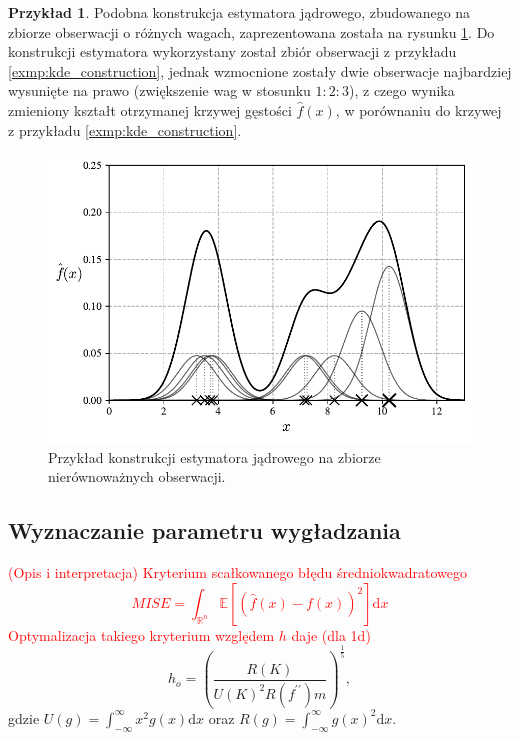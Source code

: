 \documentclass[12pt,a4paper,oneside]{book}
\theoremstyle{definition}
\newtheorem{exmp}{Przykład}[chapter]
\begin{document}
\begin{exmp}
Podobna konstrukcja estymatora jądrowego, zbudowanego na zbiorze obserwacji o różnych wagach, zaprezentowana została na rysunku \ref{fig:kde_construction_weighted}. Do konstrukcji estymatora wykorzystany został zbiór obserwacji z przykładu \ref{exmp:kde_construction}, jednak wzmocnione zostały dwie obserwacje najbardziej wysunięte na prawo (zwiększenie wag w stosunku $1:2:3$), z czego wynika zmieniony kształt otrzymanej krzywej gęstości $\hat{f}(x)$, w porównaniu do krzywej z przykładu \ref{exmp:kde_construction}.

\begin{figure}[H]
    \centering
    \includegraphics[scale=0.65]{kde_construction_weighted}
    \vspace{-0.5cm} 
    \caption{Przykład konstrukcji estymatora jądrowego na zbiorze nierównoważnych obserwacji.}
    \label{fig:kde_construction_weighted}
\end{figure}
\end{exmp}

\subsection{Wyznaczanie parametru wygładzania} \label{subsec:bandwidth_selection}

\textcolor{red}{(Opis i interpretacja) Kryterium scałkowanego błędu średniokwadratowego
\begin{equation} \label{eq:mise}
MISE = \int_{\mathbb{R}^n} \mathbb{E}[(\hat{f}(x) - f(x))^2] \mathrm{d}x
\end{equation}
Optymalizacja takiego kryterium względem $h$ daje (dla 1d)}
\begin{equation} \label{eq:opt_bandwidth1}
h_o = \left( \frac{R(K)}{U(K)^2 R(f^{\prime\prime}) m} \right)^\frac{1}{5},
\end{equation}
gdzie $U(g) = \int_{-\infty}^\infty x^2 g(x) \mathrm{d}x$ oraz $R(g) = \int_{-\infty}^\infty g(x)^2\mathrm{d}x$.
\end{document}
